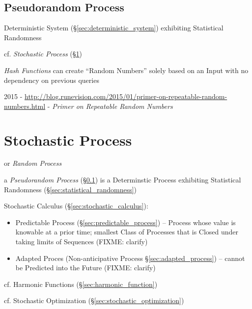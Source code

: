 \subsection{Pseudorandom Process}\label{sec:pseudorandom_process}

Deterministic System (\S\ref{sec:deterministic_system}) exhibiting Statistical
Randomness

cf. \emph{Stochastic Process} (\S\ref{sec:stochastic_process})

\emph{Hash Functions} can create ``Random Numbers'' solely based on an Input
with no dependency on previous queries

2015 -
\url{http://blog.runevision.com/2015/01/primer-on-repeatable-random-numbers.html}
- \emph{Primer on Repeatable Random Numbers}



\section{Stochastic Process}\label{sec:stochastic_process}

or \emph{Random Process}


\fist a \emph{Pseudorandom Process} (\S\ref{sec:pseudorandom_process}) is a
Determinstic Process exhibiting Statistical Randomness
(\S\ref{sec:statistical_randomness})

\fist Stochastic Calculus (\S\ref{sec:stochastic_calculus}):
\begin{itemize}
  \item Predictable Process (\S\ref{sec:predictable_process}) -- Process whose
    value is knowable at a prior time; smallest Class of Processes that is
    Closed under taking limits of Sequences (FIXME: clarify)
  \item Adapted Proces (Non-anticipative Process \S\ref{sec:adapted_process}) --
    cannot be Predicted into the Future (FIXME: clarify)
\end{itemize}

cf. Harmonic Functions (\S\ref{sec:harmonic_function})

\fist cf. Stochastic Optimization (\S\ref{sec:stochastic_optimization})

